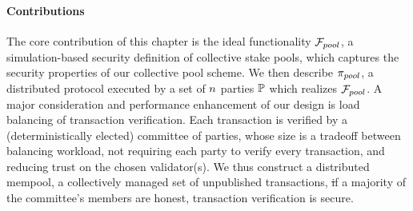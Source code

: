 \paragraph{Contributions}
The core contribution of this chapter is the ideal functionality ${\mathcal{F}}_{pool}$, a
simulation-based security definition of collective stake pools, which captures
the security properties of our collective pool scheme. We then describe
$\pi_{pool}$, a distributed protocol executed by a set of $n$ parties
$\mathbb{P}$ which realizes ${\mathcal{F}}_{pool}$. A major consideration and performance
enhancement of our design is load balancing of transaction verification. Each
transaction is verified by a (deterministically elected) committee of parties,
whose size is a tradeoff between balancing workload, \ie not requiring each
party to verify every transaction, and reducing trust on the chosen
validator(s). We thus construct a distributed mempool, \ie a collectively
managed set of unpublished transactions, \st if a majority of the committee's
members are honest, transaction verification is secure.
